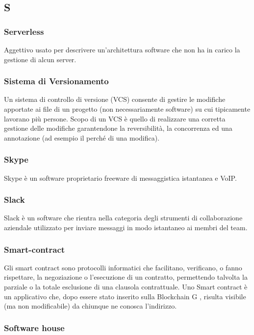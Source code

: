 \subsection*{\textbf{\hfill \Huge{S} \hfill}} 
\subsubsection*{Serverless}
Aggettivo usato per descrivere un’architettura software che non ha in carico la gestione di alcun server.
\subsubsection*{Sistema di Versionamento}
Un sistema di controllo di versione (VCS) consente di gestire le modifiche apportate ai file di un progetto (non necessariamente software) su cui tipicamente lavorano più persone. Scopo di un VCS è quello di realizzare una corretta gestione delle modifiche garantendone la reversibilità, la concorrenza ed una annotazione (ad esempio il perché di una modifica).
\subsubsection*{Skype}
Skype è un software proprietario freeware di messaggistica istantanea e VoIP.
\subsubsection*{Slack}
Slack è un software che rientra nella categoria degli strumenti di collaborazione aziendale utilizzato per inviare messaggi in modo istantaneo ai membri del team.
\subsubsection*{Smart-contract}
Gli smart contract sono protocolli informatici che facilitano, verificano, o fanno rispettare, la negoziazione o l’esecuzione di un contratto, permettendo talvolta la parziale o la totale esclusione di una clausola contrattuale. Uno Smart contract è un applicativo che, dopo essere stato inserito sulla Blockchain G , risulta visibile (ma non modificabile) da chiunque ne conosca l’indirizzo.
\subsubsection*{Software house}

